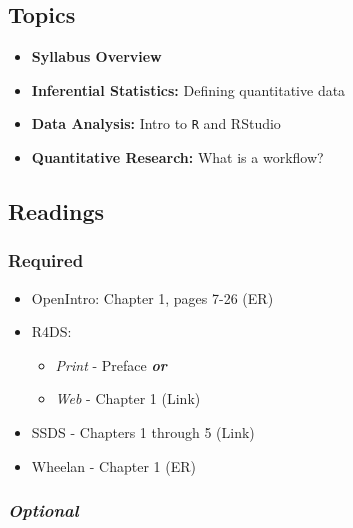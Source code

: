 \documentclass[]{book}
\providecommand{\tightlist}{%
  \setlength{\itemsep}{0pt}\setlength{\parskip}{0pt}}
\theoremstyle{definition}
\theoremstyle{definition}
\theoremstyle{definition}
\theoremstyle{remark}
\begin{document}
\hypertarget{topics-1}{%
\subsection*{Topics}\label{topics-1}}

\begin{itemize}
\tightlist
\item
  \textbf{Syllabus Overview}
\item
  \textbf{Inferential Statistics:} Defining quantitative data
\item
  \textbf{Data Analysis:} Intro to \texttt{R} and RStudio
\item
  \textbf{Quantitative Research:} What is a workflow?
\end{itemize}

\hypertarget{readings-2}{%
\subsection*{Readings}\label{readings-2}}

\hypertarget{required-2}{%
\subsubsection*{Required}\label{required-2}}

\begin{itemize}
\tightlist
\item
  OpenIntro: Chapter 1, pages 7-26 (ER)
\item
  R4DS:

  \begin{itemize}
  \tightlist
  \item
    \emph{Print} - Preface \textbf{\emph{or}}
  \item
    \emph{Web} - Chapter 1 (Link)
  \end{itemize}
\item
  SSDS - Chapters 1 through 5 (Link)
\item
  Wheelan - Chapter 1 (ER)
\end{itemize}

\hypertarget{optional-1}{%
\subsubsection*{\texorpdfstring{\emph{Optional}}{Optional}}\label{optional-1}}
\end{document}
